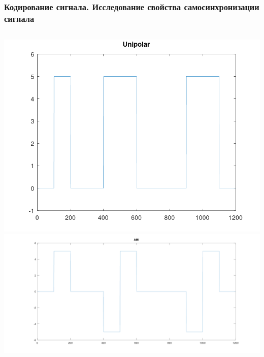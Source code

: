 \begin{frame}
\frametitle{Кодирование сигнала. Исследование свойства самосинхронизации сигнала}
\begin{columns}
            \includegraphics[width=\textwidth]{../octave/coding/signal/unipolar.png}
            \includegraphics[width=\textwidth]{../octave/coding/signal/ami.png}
\end{columns}
\end{frame}

